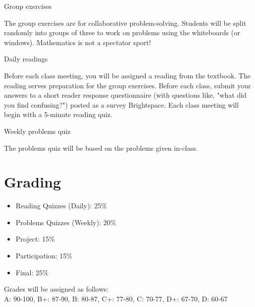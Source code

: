 \documentclass[letterpaper]{inzane_syllabus} %
\begin{document}

\vspace{0.1cm} 

{\color{myCOLOR} Group exercises}

The group exercises are for collaborative problem-solving.  Students will be split randomly into groups of three to work on problems using the whiteboards (or windows). Mathematics is not a spectator sport!

{\color{myCOLOR} Daily readings}

Before each class meeting, you will be assigned a reading from the textbook. The reading serves preparation for the group exercises. Before each class, submit your answers to a short reader response questionnaire (with questions like, "what did you find confusing?") posted as a survey Brightspace.  Each class meeting will begin with a 5-minute reading quiz.


{\color{myCOLOR} Weekly problems quiz}

The problems quiz will be based on the problems given in-class.



\newpage %

\makeSide %


\vspace{0.2cm}
\section{Grading}

\begin{itemize}
\item Reading Quizzes (Daily): 25\%  
\item Problems Quizzes (Weekly): 20\% 
\item Project: 15\% 
\item Participation: 15\% 
\item Final: 25\%
\end{itemize}

Grades will be assigned as follows: \\
A: 90-100, B+: 87-90, B: 80-87, C+: 77-80, C: 70-77, D+: 67-70, D: 60-67
\end{document}
